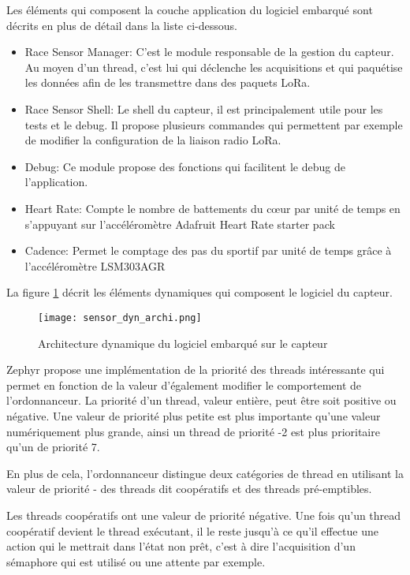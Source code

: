 Les éléments qui composent la couche application du logiciel embarqué sont décrits en plus de détail dans la liste ci-dessous.

\begin{itemize}
\item Race Sensor Manager: C'est le module responsable de la gestion du capteur. Au moyen d'un thread, c'est lui qui déclenche les acquisitions et qui paquétise les données afin de les transmettre dans des paquets LoRa.
\item Race Sensor Shell: Le shell du capteur, il est principalement utile pour les tests et le debug. Il propose plusieurs commandes qui permettent par exemple de modifier la configuration de la liaison radio LoRa.
\item Debug: Ce module propose des fonctions qui facilitent le debug de l'application.
\item Heart Rate: Compte le nombre de battements du cœur par unité de temps en s'appuyant sur l'accéléromètre Adafruit Heart Rate starter pack
\item Cadence: Permet le comptage des pas du sportif par unité de temps grâce à l'accéléromètre LSM303AGR
\end{itemize}

La figure \ref{fig:sensor_dyn_archi} décrit les éléments dynamiques qui composent le logiciel du capteur.

\begin{figure}[htb]
\centering 
\texttt{[image: sensor\_dyn\_archi.png]} 
\caption{Architecture dynamique du logiciel embarqué sur le capteur}
\label{fig:sensor_dyn_archi}
\end{figure}

Zephyr propose une implémentation de la priorité des threads intéressante qui permet en fonction de la valeur d'également modifier le comportement de l'ordonnanceur. La priorité d'un thread, valeur entière, peut être soit positive ou négative. Une valeur de priorité plus petite est plus importante qu'une valeur numériquement plus grande, ainsi un thread de priorité -2 est plus prioritaire qu'un de priorité 7.

En plus de cela, l'ordonnanceur distingue deux catégories de thread en utilisant la valeur de priorité - des threads dit coopératifs et des threads pré-emptibles.

Les threads coopératifs ont une valeur de priorité négative. Une fois qu’un thread coopératif devient le thread exécutant, il le reste jusqu'à ce qu'il effectue une action qui le mettrait dans l'état non prêt, c'est à dire l'acquisition d'un sémaphore qui est utilisé ou une attente par exemple.

